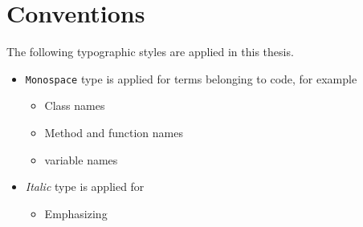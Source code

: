 \section{Conventions}

The following typographic styles are applied in this thesis.

\begin{itemize}
\item \texttt{Monospace} type is applied for terms belonging to code, for example
	\begin{itemize}
		\item Class names
		\item Method and function names
		\item variable names
	\end{itemize}
\item \emph{Italic} type is applied for
	\begin{itemize}
		\item Emphasizing
	\end{itemize}
\end{itemize}
